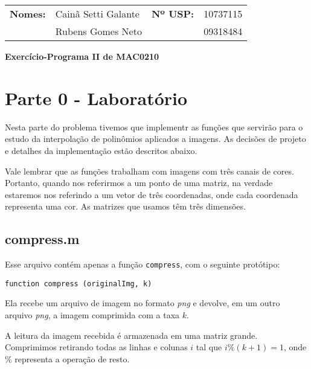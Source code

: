 \documentclass[12pt,letterpaper]{article}
\begin{document}
    \begin{table}[]
        \centering
        \label{my-label}
        \begin{tabular}{llll}
            \textbf{Nomes:}&Cainã Setti Galante &   \textbf{Nº USP:} & 10737115 \\
            & Rubens Gomes Neto &         & 09318484 \\
        \end{tabular}
    \end{table}

    \begin{center}
        \huge \bf
        Exercício-Programa II de MAC0210 \\
    \end{center}

    \section{Parte 0 - Laboratório}

    Nesta parte do problema tivemos que implementr as funções que servirão para o estudo da interpolação de polinômios aplicados a imagens. As decisões de projeto e detalhes da implementação estão descritos abaixo.

    Vale lembrar que as funções trabalham com imagens com três canais de cores. Portanto, quando nos referirmos a um ponto de uma matriz, na verdade estaremos nos referindo a um vetor de três coordenadas, onde cada coordenada representa uma cor. As matrizes que usamos têm três dimensões.

    \subsection{compress.m}

    Esse arquivo contém apenas a função \texttt{compress}, com o seguinte protótipo:

    \begin{center}
        \texttt{function compress (originalImg, k)}
    \end{center}

    Ela recebe um arquivo de imagem no formato \textit{png} e devolve, em um outro arquivo \textit{png}, a imagem comprimida com a taxa $k$.

    A leitura da imagem recebida é armazenada em uma matriz grande. Comprimimos retirando todas as linhas e colunas $i$ tal que $i\%(k+1)=1$, onde $\%$ representa a operação de resto.
\end{document}

